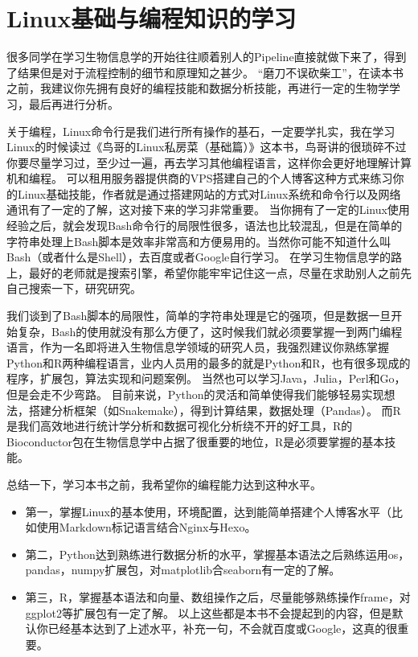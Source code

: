 \chapter{Linux基础与编程知识的学习}

很多同学在学习生物信息学的开始往往顺着别人的Pipeline直接就做下来了，得到了结果但是对于流程控制的细节和原理知之甚少。 
“磨刀不误砍柴工”，在读本书之前，我建议你先拥有良好的编程技能和数据分析技能，再进行一定的生物学学习，最后再进行分析。

关于编程，Linux命令行是我们进行所有操作的基石，一定要学扎实，我在学习Linux的时候读过《鸟哥的Linux私房菜（基础篇）》这本书，鸟哥讲的很琐碎不过你要尽量学习过，至少过一遍，再去学习其他编程语言，这样你会更好地理解计算机和编程。 
可以租用服务器提供商的VPS搭建自己的个人博客这种方式来练习你的Linux基础技能，作者就是通过搭建网站的方式对Linux系统和命令行以及网络通讯有了一定的了解，这对接下来的学习非常重要。
当你拥有了一定的Linux使用经验之后，就会发现Bash命令行的局限性很多，语法也比较混乱，但是在简单的字符串处理上Bash脚本是效率非常高和方便易用的。当然你可能不知道什么叫Bash（或者什么是Shell），去百度或者Google自行学习。
在学习生物信息学的路上，最好的老师就是搜索引擎，希望你能牢牢记住这一点，尽量在求助别人之前先自己搜索一下，研究研究。 

我们谈到了Bash脚本的局限性，简单的字符串处理是它的强项，但是数据一旦开始复杂，Bash的使用就没有那么方便了，这时候我们就必须要掌握一到两门编程语言，作为一名即将进入生物信息学领域的研究人员，我强烈建议你熟练掌握Python和R两种编程语言，业内人员用的最多的就是Python和R，也有很多现成的程序，扩展包，算法实现和问题案例。 当然也可以学习Java，Julia，Perl和Go，但是会走不少弯路。 目前来说，Python的灵活和简单使得我们能够轻易实现想法，搭建分析框架（如Snakemake），得到计算结果，数据处理（Pandas）。 
而R是我们高效地进行统计学分析和数据可视化分析绕不开的好工具，R的Bioconductor包在生物信息学中占据了很重要的地位，R是必须要掌握的基本技能。

总结一下，学习本书之前，我希望你的编程能力达到这种水平。


\begin{itemize}
	\item 
	第一，掌握Linux的基本使用，环境配置，达到能简单搭建个人博客水平（比如使用Markdown标记语言结合Nginx与Hexo。
	\item 第二，Python达到熟练进行数据分析的水平，掌握基本语法之后熟练运用os，pandas，numpy扩展包，对matplotlib合seaborn有一定的了解。
	\item 
	第三，R，掌握基本语法和向量、数组操作之后，尽量能够熟练操作frame，对ggplot2等扩展包有一定了解。 以上这些都是本书不会提起到的内容，但是默认你已经基本达到了上述水平，补充一句，不会就百度或Google，这真的很重要。
\end{itemize}

